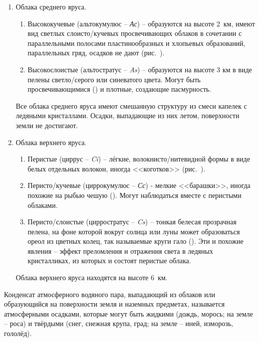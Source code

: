 \begin{enumerate}[label=\Roman*.]
\item Облака среднего яруса.
  \begin{enumerate}[label=\arabic*)]
  \item Высококучевые (альтокумулюс \--- \textit{Ас}) \--- образуются
    на высоте 2~км, имеют вид светлых слоисто\-/кучевых
    просвечивающих облаков в сочетании с параллельными полосами
    пластинообразных и хлопьевых образований, параллельных гряд,
    осадков не дают (рис.~).
  \item Высокослоистые (альтостратус \--- \textit{As}) \--- образуются
    на высоте 3 км в виде пелены светло\-/серого или синеватого
    цвета. Могут быть просвечивающимися () и плотные, создающие
    пасмурность.
  \end{enumerate}
  Все облака среднего яруса имеют смешанную структуру из смеси капелек с ледяными кристаллами. Осадки, выпадающие из них летом, поверхности земли не достигают.
  
\item Облака верхнего яруса. 
  \begin{enumerate}[label=\arabic*)]
  \item Перистые (циррус \--- \textit{Ci}) \--- лёгкие,
    волокнисто\-/нитевидной формы в виде белых отдельных волокон,
    иногда <<коготков>> (рис.~).
  \item Перисто\-/кучевые (циррокумулюс \--- \textit{Сс}) - мелкие
    <<барашки>>, иногда похожие на рыбью чешую (). Могут наблюдаться
    вместе с перистыми облаками.
  \item Перисто\-/слоистые (цирростратус \--- \textit{Cs}) \--- тонкая
    белесая прозрачная пелена, на фоне которой вокруг солнца или луны
    может образоваться ореол из цветных колец, так называемые круги
    гало (). Эти и похожие явления \--- эффект преломления и отражения
    света в ледяных кристалликах, из которых и состоят перистые
    облака.
    \end{enumerate}
    Облака верхнего яруса находятся на высоте 6~км.
\end{enumerate}

Конденсат атмосферного водяного пара, выпадающий из облаков или
образующийся на поверхности земля и наземных предметах, называется
атмосферными  осадками, которые могут быть
жидкими (дождь, морось; на земле \--- роса) и твёрдыми (снег, снежная
крупа, град; на земле \--- иней, изморозь, гололёд).

